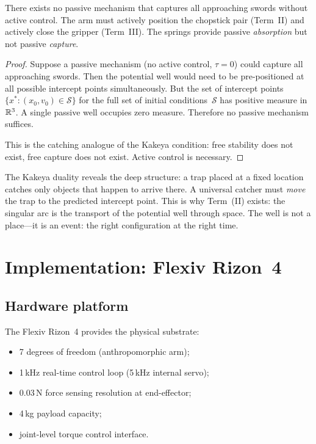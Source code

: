 \begin{corollary}
\label{cor:c-kakeya}
There exists no passive mechanism that captures all approaching
swords without active control.  The arm must actively position
the chopstick pair (Term~II) and actively close the gripper
(Term~III).  The springs provide passive \emph{absorption} but
not passive \emph{capture}.
\end{corollary}

\begin{proof}
Suppose a passive mechanism (no active control, $\tau = 0$)
could capture all approaching swords.  Then the potential well
would need to be pre-positioned at all possible intercept
points simultaneously.  But the set of intercept points
$\{x^* : (x_0, v_0) \in \mathcal{S}\}$ for the full set of
initial conditions~$\mathcal{S}$ has positive measure in
$\mathbb{R}^3$.  A single passive well occupies zero measure.
Therefore no passive mechanism suffices.

This is the catching analogue of the Kakeya condition: free
stability does not exist, free capture does not exist.
Active control is necessary.
\end{proof}

\begin{remark}
The Kakeya duality reveals the deep structure: a trap
placed at a fixed location catches only objects that happen
to arrive there.  A universal catcher must \emph{move} the
trap to the predicted intercept point.  This is why
Term~(II) exists: the singular arc is the transport of the
potential well through space.  The well is not a place---it
is an event: the right configuration at the right time.
\end{remark}


\section{Implementation: Flexiv Rizon~4}
\label{sec:c-impl}

\subsection{Hardware platform}

The Flexiv Rizon~4 provides the physical substrate:
\begin{itemize}[nosep]
  \item 7 degrees of freedom (anthropomorphic arm);
  \item 1\,kHz real-time control loop (5\,kHz internal servo);
  \item 0.03\,N force sensing resolution at end-effector;
  \item 4\,kg payload capacity;
  \item joint-level torque control interface.
\end{itemize}

